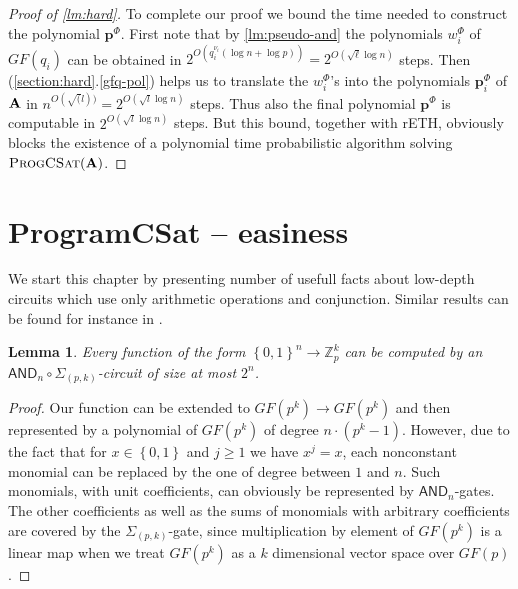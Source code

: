 \documentclass[11pt,a4paper]{amsart}
\newtheorem{lm}{Lemma}[section]
\newcommand{\m}[1]{{\uppercase {\bf{#1}}}}
\newcommand{\set}[1]{{\left\{ {#1} \right\} }}
\renewcommand{\geq}{\geqslant}
\newcommand{\po}[1]{{\mathbf {#1}}}
\newcounter{note}
\newcommand{\map}{\longrightarrow}
\newcommand{\gProblem}[2]{\ensuremath{\operatorname{\textup{\textsc{{#2}}}}
		\ifthenelse{\equal{#1}{}}{}{\!\left( {#1} \right)}}}
\newcommand{\progcsat}[1]{\gProblem{#1}{ProgCSat}}
\newcommand{\z}{\mathbb{Z}}
\newcommand{\sumpk}[2]{\Sigma_{(#1,#2)}}
\newcommand{\ccand}{\mathsf{AND}}
\newcommand{\rethh}{rETH\xspace}
\begin{document}
\begin{proof}[Proof of \cref{lm:hard}]
To complete our proof we bound the time needed to construct the polynomial $\po p^\Phi$.
First note that by \cref{lm:pseudo-and} the polynomials $w^\Phi_i$ of $GF(q_i)$
can be obtained in $2^{O(q_i^{\nu_i}(\log n+\log p))}=2^{O(\sqrt{\ell}\log n)}$ steps.
Then (\ref{section:hard}.\ref{gfq-pol}) helps us to translate the $w^\Phi_i$'s
into the polynomials $\po p_i^\Phi$ of $\m A$ in $n^{O(\sqrt(l))}=2^{O(\sqrt{l}\log n)}$ steps.
Thus also the final polynomial $\po p^\Phi$ is computable in $2^{O(\sqrt{l}\log n)}$ steps.
But this bound, together with \rethh,
obviously blocks the existence of a polynomial time probabilistic algorithm solving \progcsat{\m A}. 
\end{proof}








\section{ProgramCSat -- easiness}
\label{section:easy}



We start this chapter by presenting number of usefull facts about low-depth circuits  which use only arithmetic operations and conjunction. Similar results can be found for instance in \cite{Grolmusz01, GrolmuszT00}.



\begin{lm}\label{lm:and-sum}
Every function of the form $\set{0,1}^n \map \z_p^k$
can be computed by an $\ccand_n\circ\sumpk{p}{k}$-circuit of size at most $2^n$.
\end{lm}

\begin{proof}
Our function can be extended to $GF(p^k)\map GF(p^k)$
and then represented by a polynomial of $GF(p^k)$ of degree $n\cdot(p^k-1)$.
However, due to the fact that for $x\in\set{0,1}$ and $j\geq1$ we have $x^j=x$, each nonconstant monomial can be replaced by the one of degree between $1$ and $n$.
Such monomials, with unit coefficients, can obviously be represented by $\ccand_n$-gates.
The other coefficients as well as the sums of monomials with arbitrary coefficients are covered by the $\sumpk{p}{k}$-gate, since multiplication by element of $GF(p^k)$ is a linear map when we treat $GF(p^k)$ as a $k$ dimensional vector space over $GF(p)$.
\end{proof}
\end{document}
